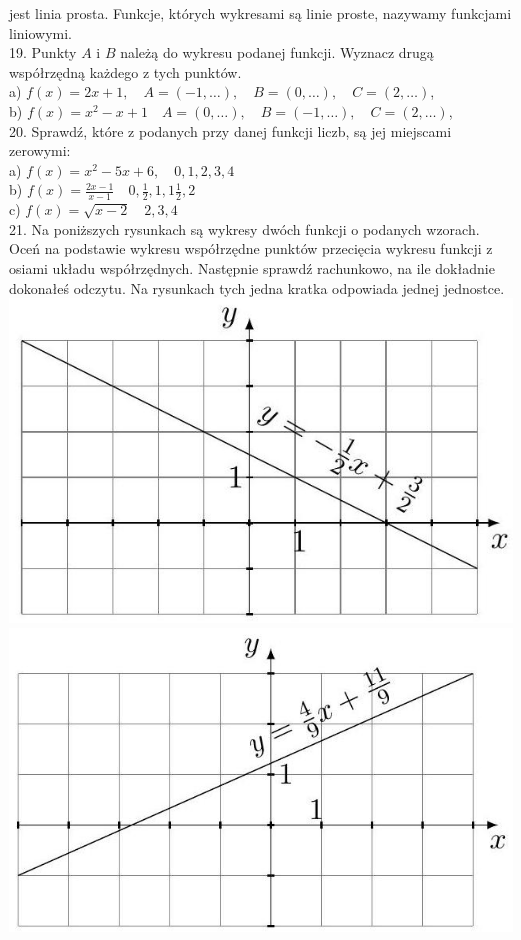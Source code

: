 \documentclass[10pt]{article}
\begin{document}
jest linia prosta. Funkcje, których wykresami są linie proste, nazywamy funkcjami liniowymi.\\
19. Punkty \(A\) i \(B\) należą do wykresu podanej funkcji. Wyznacz drugą współrzędną każdego z tych punktów.\\
a) \(f(x)=2 x+1, \quad A=(-1, \ldots), \quad B=(0, \ldots), \quad C=(2, \ldots)\),\\
b) \(f(x)=x^{2}-x+1 \quad A=(0, \ldots), \quad B=(-1, \ldots), \quad C=(2, \ldots)\),\\
20. Sprawdź, które z podanych przy danej funkcji liczb, są jej miejscami zerowymi:\\
a) \(f(x)=x^{2}-5 x+6, \quad 0,1,2,3,4\)\\
b) \(f(x)=\frac{2 x-1}{x-1} \quad 0, \frac{1}{2}, 1,1 \frac{1}{2}, 2\)\\
c) \(f(x)=\sqrt{x-2} \quad 2,3,4\)\\
21. Na poniższych rysunkach są wykresy dwóch funkcji o podanych wzorach. Oceń na podstawie wykresu współrzędne punktów przecięcia wykresu funkcji z osiami układu współrzędnych. Następnie sprawdź rachunkowo, na ile dokładnie dokonałeś odczytu. Na rysunkach tych jedna kratka odpowiada jednej jednostce.\\
\includegraphics[max width=\textwidth, center]{2024_11_21_e9b4faa005d5be2cc318g-131(2)}\\
\includegraphics[max width=\textwidth, center]{2024_11_21_e9b4faa005d5be2cc318g-131}\\
\end{document}
